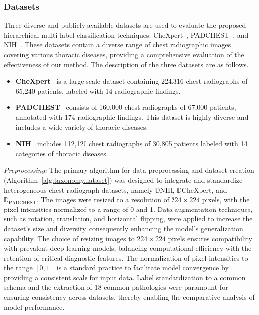 \documentclass[review,1p,times,numbers]{elsarticle}
\begin{document}
\subsubsection{Datasets}
Three diverse and publicly available datasets are used to evaluate the proposed hierarchical multi-label classification techniques: CheXpert~\cite{irvin_CheXpert_2019}, PADCHEST~\cite{bustos_Padchest_2020}, and NIH~\cite{wang_ChestXRay8_2017}. These datasets contain a diverse range of chest radiographic images covering various thoracic diseases, providing a comprehensive evaluation of the effectiveness of our method. The description of the three datasets are as follows.
\begin{itemize}
    \item  \textbf{CheXpert}~\cite{irvin_CheXpert_2019} is a large-scale dataset containing 224,316 chest radiographs of 65,240 patients, labeled with 14 radiographic findings.
    \item \textbf{PADCHEST}~\cite{bustos_Padchest_2020} consists of 160,000 chest radiographs of 67,000 patients, annotated with 174 radiographic findings. This dataset is highly diverse and includes a wide variety of thoracic diseases.
    \item \textbf{NIH}~\cite{wang_ChestXRay8_2017} includes 112,120 chest radiographs of 30,805 patients labeled with 14 categories of thoracic diseases.
\end{itemize}

\textit{Preprocessing: }
The primary algorithm for data preprocessing and dataset creation (Algorithm~\ref{alg:taxonomy.dataset}) was designed to integrate and standardize heterogeneous chest radiograph datasets, namely $\mathbb{D}{\text{NIH}}$, $\mathbb{D}{\text{CheXpert}}$, and $\mathbb{D}_{\text{PADCHEST}}$. The images were resized to a resolution of $224 \times 224$ pixels, with the pixel intensities normalized to a range of 0 and 1. Data augmentation techniques, such as rotation, translation, and horizontal flipping, were applied to increase the dataset's size and diversity, consequently enhancing the model's generalization capability. The choice of resizing images to $224 \times 224$ pixels ensures compatibility with prevalent deep learning models, balancing computational efficiency with the retention of critical diagnostic features. The normalization of pixel intensities to the range $[0, 1]$ is a standard practice to facilitate model convergence by providing a consistent scale for input data. Label standardization to a common schema and the extraction of 18 common pathologies were paramount for ensuring consistency across datasets, thereby enabling the comparative analysis of model performance.
\end{document}
